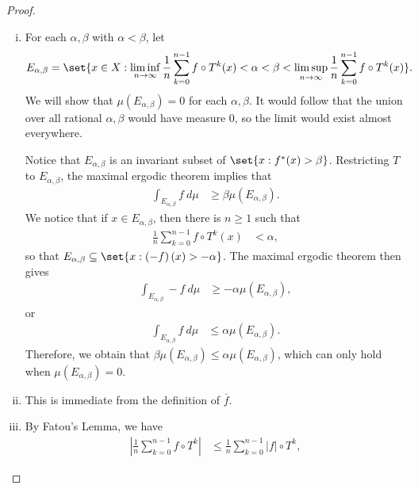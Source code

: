 \documentclass[10pt]{mypackage}
\begin{document}
\begin{proof}\hfill
  \begin{enumerate}[(i)]
    \item For each $\alpha,\beta$ with $\alpha < \beta$, let
      \begin{align*}
        E_{\alpha,\beta} &= \set{x\in X : \liminf_{n\rightarrow\infty}\frac{1}{n} \sum_{k=0}^{n-1}f\circ T^{k}(x) < \alpha < \beta < \limsup_{n\rightarrow\infty} \frac{1}{n}\sum_{k=0}^{n-1}f\circ T^{k}(x)}.
      \end{align*}
      We will show that $\mu\left( E_{\alpha,\beta} \right) = 0$ for each $\alpha,\beta$. It would follow that the union over all rational $\alpha,\beta$ would have measure $0$, so the limit would exist almost everywhere.

      Notice that $E_{\alpha,\beta}$ is an invariant subset of $\set{x : f^{\ast}(x) > \beta}$. Restricting $T$ to $E_{\alpha,\beta}$, the maximal ergodic theorem implies that
      \begin{align*}
        \int_{E_{\alpha,\beta}}^{} f\:d\mu &\geq \beta \mu\left( E_{\alpha,\beta} \right).
      \end{align*}
      We notice that if $x\in E_{\alpha,\beta}$, then there is $n\geq 1$ such that
      \begin{align*}
        \frac{1}{n}\sum_{k=0}^{n-1}f\circ T^{k}(x) &< \alpha,
      \end{align*}
      so that $E_{\alpha,\beta}\subseteq \set{x : \left( -f \right)(x) > -\alpha}$. The maximal ergodic theorem then gives
      \begin{align*}
        \int_{E_{\alpha,\beta}}^{} -f\:d\mu &\geq -\alpha\mu\left( E_{\alpha,\beta} \right),
      \end{align*}
      or
      \begin{align*}
        \int_{E_{\alpha,\beta}}^{} f\:d\mu &\leq \alpha\mu\left( E_{\alpha,\beta} \right).
      \end{align*}
      Therefore, we obtain that $\beta\mu \left( E_{\alpha,\beta} \right)\leq \alpha\mu\left( E_{\alpha,\beta} \right)$, which can only hold when $\mu\left( E_{\alpha,\beta} \right) = 0$.
    \item This is immediate from the definition of $ \overline{f} $.
    \item By Fatou's Lemma, we have
      \begin{align*}
        \left\vert \frac{1}{n}\sum_{k=0}^{n-1}f\circ T^{k} \right\vert &\leq \frac{1}{n}\sum_{k=0}^{n-1} \left\vert f \right\vert\circ T^{k},

\end{align*}
\end{enumerate}
\end{proof}
\end{document}

